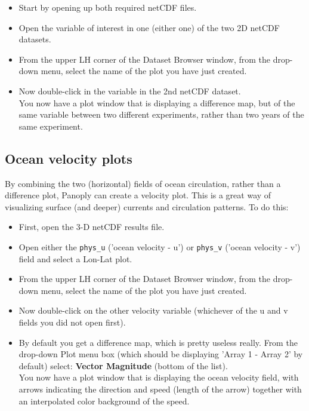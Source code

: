 \documentclass[11pt,fleqn]{book} %
\begin{document}
\begin{itemize}
\item Start by opening up both required netCDF files.
\item Open the variable of interest in one (either one) of the two 2D netCDF datasets. 
\item From the upper LH corner of the Dataset Browser window, from the drop-down menu, select the name of the plot you have just created.
\item Now double-click in the variable in the 2nd netCDF dataset.
        \\ You now have a plot window that is displaying a difference map, but of the same variable between two different experiments, rather than two years of the same experiment.
\end{itemize}


\subsection{Ocean velocity plots}

By combining the two (horizontal) fields of ocean circulation, rather than a difference plot, Panoply can create a velocity plot. This is a great way of visualizing surface (and deeper) currents and circulation patterns. To do this:

\begin{itemize}
\item First, open the 3-D netCDF results file.
\item Open either the \texttt{phys\_u} ('ocean velocity - u') or \texttt{phys\_v} ('ocean velocity - v') field and select a Lon-Lat plot.
\item From the upper LH corner of the Dataset Browser window, from the drop-down menu, select the name of the plot you have just created.
\item Now double-click on the other velocity variable (whichever of the u and v fields you did not open first).
\item By default you get a difference map, which is pretty useless really. From the drop-down Plot menu box (which should be displaying 'Array 1 - Array 2' by default) select: \textbf{Vector Magnitude} (bottom of the list).
        \\ You now have a plot window that is displaying the ocean velocity field, with arrows indicating the direction and speed (length of the arrow) together with an interpolated color background of the speed.
\end{itemize}
\end{document}
